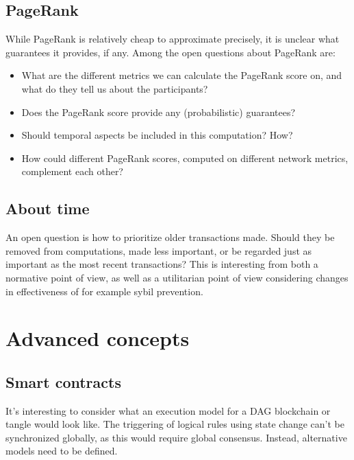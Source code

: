 \subsection{PageRank}
While PageRank is relatively cheap to approximate precisely, it is unclear what guarantees it provides, if any. Among the open questions about PageRank are:
\begin{itemize}
	\item What are the different metrics we can calculate the PageRank score on, and what do they tell us about the participants?
	\item Does the PageRank score provide any (probabilistic) guarantees?
	\item Should temporal aspects be included in this computation? How?
	\item How could different PageRank scores, computed on different network metrics, complement each other?
\end{itemize}

\subsection{About time}
An open question is how to prioritize older transactions made. Should they be removed from computations, made less important, or be regarded just as important as the most recent transactions? This is interesting from both a normative point of view, as well as a utilitarian point of view considering changes in effectiveness of for example sybil prevention.

\section{Advanced concepts}
\subsection{Smart contracts}
It's interesting to consider what an execution model for a DAG blockchain or tangle would look like. The triggering of logical rules using state change can't be synchronized globally, as this would require global consensus. Instead, alternative models need to be defined.

